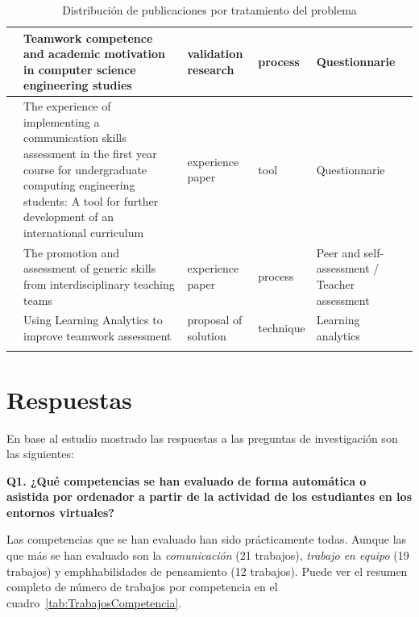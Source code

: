 \begin{landscape}
\begin{center}
\begin{longtable}{| m{2.5cm} | m{9cm} | m{4cm} | m{2.5cm} | m{3.5cm} |}
    \hline
    \cite{martinez2014teamwork} & Teamwork competence and academic motivation in computer science engineering studies & validation research & process & Questionnarie \\
    \hline
    \cite{fernandez2011experience} & The experience of implementing a communication skills assessment in the first year course for undergraduate computing engineering students: A tool for further development of an international curriculum & experience paper & tool & Questionnarie \\
    \hline
    \cite{carreras2013promotion} & The promotion and assessment of generic skills from interdisciplinary teaching teams & experience paper & process & Peer and self-assessment / Teacher assessment \\
    \hline
    \cite{fidalgo:2015} & Using Learning Analytics to improve teamwork assessment & proposal of solution & technique & Learning analytics \\
    \hline
\caption{Distribución de publicaciones por tratamiento del problema}
\label{tab:ListadoTrabajos}
\end{longtable}
\end{center}
\end{landscape}

\pagestyle{fancy}
\section{Respuestas}

En base al estudio mostrado las respuestas a las preguntas de investigación son las siguientes:

\bigskip
\textbf{Q1. ¿Qué competencias se han evaluado de forma automática o asistida por ordenador a partir de la actividad de los estudiantes en los entornos virtuales?}

Las competencias que se han evaluado han sido prácticamente todas. Aunque las que más se han evaluado son la \emph{comunicación} (21 trabajos), \emph{trabajo en equipo} (19 trabajos) y emph{habilidades de pensamiento} (12 trabajos). Puede ver el resumen completo de número de trabajos por competencia en el cuadro~\ref{tab:TrabajosCompetencia}.

